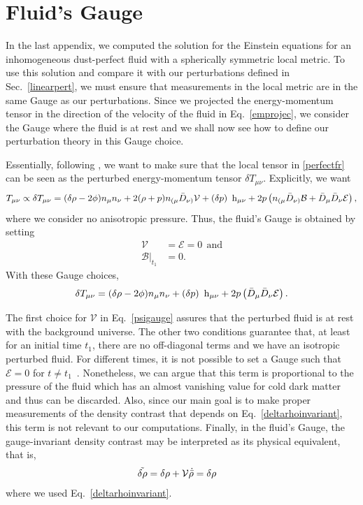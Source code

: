\documentclass[a4paper,11pt]{article}
\begin{document}
\section{Fluid's Gauge}
\label{appgauge}
In the last appendix, we computed the solution for the Einstein equations for an inhomogeneous dust-perfect fluid with a spherically symmetric local metric. To use this solution and compare it with our perturbations defined in Sec.~\ref{linearpert}, we must ensure that measurements in the local metric are in the same Gauge as our perturbations. Since we projected the energy-momentum tensor in the direction of the velocity of the fluid in Eq.~\eqref{emprojec}, we consider the Gauge where the fluid is at rest and we shall now see how to define our perturbation theory in this Gauge choice.

Essentially, following \cite{Vitenti2014covariant}, we want to make sure that the local tensor in \eqref{perfectfr} can be seen as the perturbed energy-momentum tensor $\delta T_{\mu\nu}$. Explicitly, we want
\begin{align}
    T_{\mu \nu}\propto \delta T_{\mu \nu}=(\delta \rho-2 \phi) n_\mu n_\nu+2(\rho+p) n_{(\mu} \Bar{D}_{\nu)}\mathcal{V}+ \left(\delta p \right)\mathrm{~h}_{\mu \nu}+2 p\left(n_{(\mu} \Bar{D}_{\nu)}\mathcal{B}+\Bar{D}_\mu \Bar{D}_\nu \mathcal{E}\right)
,\end{align}
where we consider no anisotropic pressure. Thus,
the fluid's Gauge is obtained by setting
\begin{align}
\label{psigauge}
    \mathcal{V} &= \mathcal{E}= 0 ~~\text{and} \\
  \mathcal{B}\rvert_{t_1} &= 0
.    \end{align}
With these Gauge choices,
\begin{align}
\label{tensorconect}
    \delta T_{\mu \nu}=(\delta \rho-2 \phi) n_\mu n_\nu+ \left(\delta p \right)\mathrm{~h}_{\mu \nu}+2 p\left(\Bar{D}_\mu \Bar{D}_\nu \mathcal{E}\right)
.\end{align}

The first choice for $\mathcal{V}$ in Eq.~\eqref{psigauge} assures that the perturbed fluid is at rest with the background universe. The other two conditions guarantee that, at least for an initial time $t_1$, there are no off-diagonal terms and we have an isotropic perturbed fluid. For different times, it is not possible to set a Gauge such that $\mathcal{E}=0$ for $t \neq t_1$~\cite{vitenti2012large}. Nonetheless, we can argue that this term is proportional to the pressure of the fluid which has an almost vanishing value for cold dark matter and thus can be discarded. Also, since our main goal is to make proper measurements of the density contrast that depends on Eq.~\eqref{deltarhoinvariant}, this term is not relevant to our computations. Finally, in the fluid's Gauge, the gauge-invariant density contrast may be interpreted as its physical equivalent, that is,
\begin{align}
\label{physicalrho}
    \Tilde{\delta \rho}&= \delta \rho + \mathcal{V}\dot{\Bar{\rho}} = \delta \rho\end{align}
where we used Eq.~\eqref{deltarhoinvariant}. 
\acknowledgments
\end{document}
